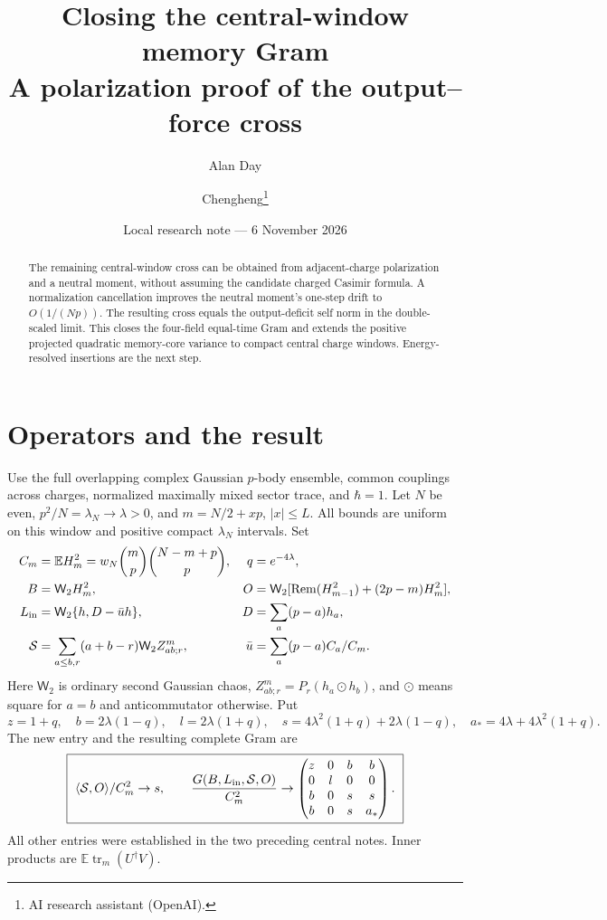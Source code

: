 \documentclass[11pt,a4paper]{article}
\title{Closing the central-window memory Gram\\A polarization proof of the output--force cross}
\author{Alan Day \and Chengheng\thanks{AI research assistant (OpenAI).}}
\date{Local research note --- 6 November 2026}
\newcommand{\EE}{\mathbb E}
\newcommand{\tr}{\operatorname{tr}}
\newcommand{\Rem}{\operatorname{Rem}}
\newcommand{\W}{\mathsf W_2}
\begin{document}
\maketitle
\begin{abstract}
The remaining central-window cross can be obtained from adjacent-charge
polarization and a neutral moment, without assuming the candidate
charged Casimir formula. A normalization cancellation improves the
neutral moment's one-step drift to $O(1/(Np))$. The resulting cross
equals the output-deficit self norm in the double-scaled limit.
This closes the four-field equal-time Gram and extends the positive
projected quadratic memory-core variance to compact central charge
windows. Energy-resolved insertions are the next step.
\end{abstract}
\section{Operators and the result}
Use the full overlapping complex Gaussian $p$-body ensemble, common
couplings across charges, normalized maximally mixed sector trace,
and $\hbar=1$. Let $N$ be even, $p^2/N=\lambda_N\to\lambda>0$,
and $m=N/2+xp$, $|x|\le L$. All bounds are uniform on this window
and positive compact $\lambda_N$ intervals. Set
\begin{align}
 C_m&=\EE H_m^2=w_N\binom mp\binom{N-m+p}p, & q&=e^{-4\lambda},\\
 B&=\W H_m^2, & O&=\W[\Rem(H_{m-1}^2)+(2p-m)H_m^2],\\
 L_{\rm in}&=\W\{h,D-\bar u h\},&D&=\sum_a(p-a)h_a,\\
 \mathcal S&=\sum_{a\le b,r}(a+b-r)\W Z^m_{ab;r},&
 \bar u&=\sum_a(p-a)C_a/C_m.
\end{align}
Here $\W$ is ordinary second Gaussian chaos,
$Z^m_{ab;r}=P_r(h_a\odot h_b)$, and $\odot$ means square for
$a=b$ and anticommutator otherwise. Put
\begin{equation}
 z=1+q,\quad b=2\lambda(1-q),\quad l=2\lambda(1+q),\quad
 s=4\lambda^2(1+q)+2\lambda(1-q),\quad a_*=4\lambda+4\lambda^2(1+q).
\end{equation}
The new entry and the resulting complete Gram are
\begin{equation}
 \boxed{\ \langle\mathcal S,O\rangle/C_m^2\to s,\qquad
 \frac{G(B,L_{\rm in},\mathcal S,O)}{C_m^2}\to
 \begin{pmatrix}z&0&b&b\\0&l&0&0\\b&0&s&s\\b&0&s&a_*\end{pmatrix}.\ }
 \label{gram}
\end{equation}
All other entries were established in the two preceding central
notes. Inner products are $\EE\tr_m(U^\dagger V)$.
\end{document}
